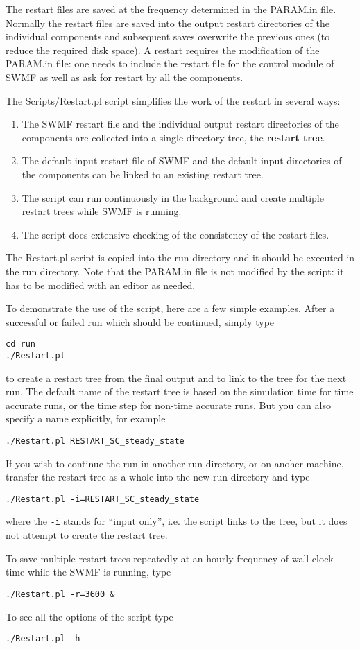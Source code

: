 The restart files are saved at the frequency determined in the PARAM.in file.
Normally the restart files are saved into the output restart directories
of the individual components and subsequent saves overwrite the previous ones
(to reduce the required disk space). A restart requires the modification
of the PARAM.in file: one needs to include the restart file for the
control module of SWMF as well as ask for restart by all the components.

The Scripts/Restart.pl script simplifies the work of the restart in
several ways:
\begin{enumerate}
\item The SWMF restart file and the individual output restart 
directories of the components are collected into a single directory tree, 
the {\bf restart tree}.
\item The default input restart file of SWMF and the default 
      input directories of the components can be linked to an existing
      restart tree.
\item The script can run continuously in the background and create
      multiple restart trees while SWMF is running. 
\item The script does extensive checking of the consistency 
      of the restart files.
\end{enumerate}
The Restart.pl script is copied into the run directory and it should
be executed in the run directory. Note that the PARAM.in file is not
modified by the script: it has to be modified with an editor as needed.

To demonstrate the use of the script, here are a few simple examples.
After a successful or failed run which should be continued, simply type
\begin{verbatim}
cd run
./Restart.pl
\end{verbatim}
to create a restart tree from the final output and to link to the tree for the
next run. The default name of the restart tree is based on the simulation time
for time accurate runs, or the time step for non-time accurate runs.
But you can also specify a name explicitly, for example
\begin{verbatim}
./Restart.pl RESTART_SC_steady_state
\end{verbatim}
If you wish to continue the run in another run directory, or on anoher
machine, transfer the restart tree as a whole into the new run
directory and type
\begin{verbatim}
./Restart.pl -i=RESTART_SC_steady_state
\end{verbatim}
where the {\tt -i} stands for ``input only'', i.e. the script links to
the tree, but it does not attempt to create the restart tree.

To save multiple restart trees repeatedly at an hourly frequency of 
wall clock time while the SWMF is running, type
\begin{verbatim}
./Restart.pl -r=3600 &
\end{verbatim}
To see all the options of the script type
\begin{verbatim}
./Restart.pl -h
\end{verbatim}

%
